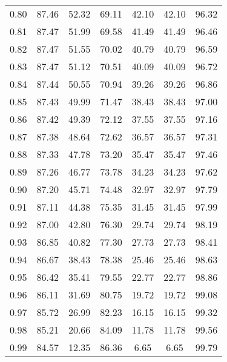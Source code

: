 \begin{tabular}{|c|c|c|c|c|c|c|}
      0.80 &     87.46 &     52.32 &      69.11 &   42.10 &      42.10 &         96.32 \\
      0.81 &     87.47 &     51.99 &      69.58 &   41.49 &      41.49 &         96.46 \\
      0.82 &     87.47 &     51.55 &      70.02 &   40.79 &      40.79 &         96.59 \\
      0.83 &     87.47 &     51.12 &      70.51 &   40.09 &      40.09 &         96.72 \\
      0.84 &     87.44 &     50.55 &      70.94 &   39.26 &      39.26 &         96.86 \\
      0.85 &     87.43 &     49.99 &      71.47 &   38.43 &      38.43 &         97.00 \\
      0.86 &     87.42 &     49.39 &      72.12 &   37.55 &      37.55 &         97.16 \\
      0.87 &     87.38 &     48.64 &      72.62 &   36.57 &      36.57 &         97.31 \\
      0.88 &     87.33 &     47.78 &      73.20 &   35.47 &      35.47 &         97.46 \\
      0.89 &     87.26 &     46.77 &      73.78 &   34.23 &      34.23 &         97.62 \\
      0.90 &     87.20 &     45.71 &      74.48 &   32.97 &      32.97 &         97.79 \\
      0.91 &     87.11 &     44.38 &      75.35 &   31.45 &      31.45 &         97.99 \\
      0.92 &     87.00 &     42.80 &      76.30 &   29.74 &      29.74 &         98.19 \\
      0.93 &     86.85 &     40.82 &      77.30 &   27.73 &      27.73 &         98.41 \\
      0.94 &     86.67 &     38.43 &      78.38 &   25.46 &      25.46 &         98.63 \\
      0.95 &     86.42 &     35.41 &      79.55 &   22.77 &      22.77 &         98.86 \\
      0.96 &     86.11 &     31.69 &      80.75 &   19.72 &      19.72 &         99.08 \\
      0.97 &     85.72 &     26.99 &      82.23 &   16.15 &      16.15 &         99.32 \\
      0.98 &     85.21 &     20.66 &      84.09 &   11.78 &      11.78 &         99.56 \\
      0.99 &     84.57 &     12.35 &      86.36 &    6.65 &       6.65 &         99.79 \\
\bottomrule
\end{tabular}
